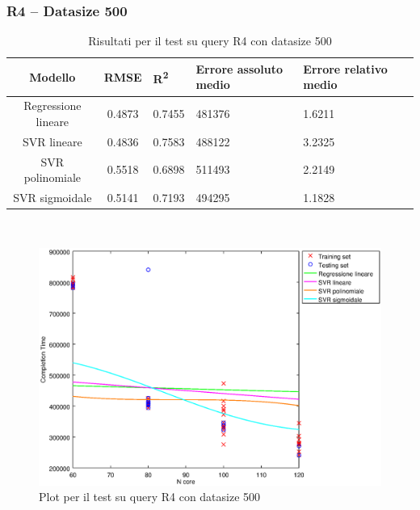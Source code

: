 \documentclass[a4paper,11pt]{article}
\begin{document}
\subsubsection{R4 -- Datasize 500}
\begin{table}[bhpt]
	\centering
	\begin{adjustbox}{center}
		\begin{tabular}{c | c M{1.2cm} M{2.5cm} M{2.5cm} M{1.8cm}}
			Modello & RMSE & R\textsuperscript{2} & Errore assoluto medio & Errore relativo medio \tabularnewline
			\hline
			Regressione lineare & 0.4873 & 0.7455 & 481376 & 1.6211 \\
			SVR lineare & 0.4836 & 0.7583 & 488122 & 3.2325 \\
			SVR polinomiale & 0.5518 & 0.6898 & 511493 & 2.2149 \\
			SVR sigmoidale & 0.5141 & 0.7193 & 494295 & 1.1828 \\
		\end{tabular}
	\end{adjustbox}
	\\
	\caption{Risultati per il test su query R4 con datasize 500}
	\label{table_R4_500}
\end{table}

\begin {figure}[hbtp]
\centering
\includegraphics[width=\textwidth]{output/R4_500/plot_R4_500.eps}
\caption {Plot per il test su query R4 con datasize 500}
\end {figure}
\newpage
\end{document}

